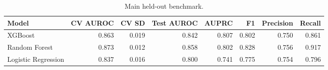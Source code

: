 \begin{table}[htbp]
\centering
\caption{Main held-out benchmark.}
\label{tab:main_benchmark_recomputed}
\begin{tabular}{lrrrrrrr}
\toprule
Model & CV AUROC & CV SD & Test AUROC & AUPRC & F1 & Precision & Recall \\
\midrule
XGBoost & 0.863 & 0.019 & 0.842 & 0.807 & 0.802 & 0.750 & 0.861 \\
Random Forest & 0.873 & 0.012 & 0.858 & 0.802 & 0.828 & 0.756 & 0.917 \\
Logistic Regression & 0.837 & 0.016 & 0.800 & 0.741 & 0.775 & 0.754 & 0.796 \\
\bottomrule
\end{tabular}

\end{table}

